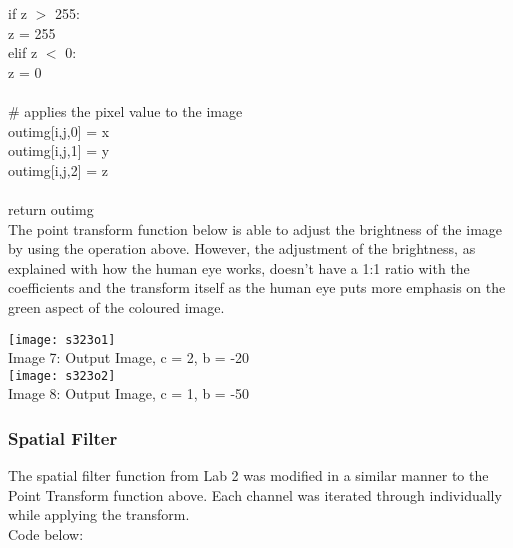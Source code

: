 \documentclass{article}
\begin{document}
	\indent \indent \indent if z $>$ 255:\\
	\indent \indent \indent \indent z = 255\\
	\indent \indent \indent elif z $<$ 0:\\
	\indent \indent \indent \indent z = 0\\
	\\
	\indent \indent \indent \# applies the pixel value to the image\\
	\indent \indent \indent out\textunderscore img[i,j,0] = x\\
	\indent \indent \indent out\textunderscore img[i,j,1] = y\\
	\indent \indent \indent out\textunderscore img[i,j,2] = z\\
	\\
	\indent return out\textunderscore img\\
	
	The point transform function below is able to adjust the brightness of the image by using the operation above. However, the adjustment of the brightness, as explained with how the human eye works, doesn't have a 1:1 ratio with the coefficients and the transform itself as the human eye puts more emphasis on the green aspect of the coloured image.\\
	
	\begin{center}
		
		\noindent \texttt{[image: s323o1]}\\
		Image 7: Output Image, c = 2, b = -20\\
		
		\noindent \texttt{[image: s323o2]}\\
		Image 8: Output Image, c = 1, b = -50\\
	\end{center}
	
	\subsubsection{Spatial Filter}
	
	The spatial filter function from Lab 2 was modified in a similar manner to the Point Transform function above. Each channel was iterated through individually while applying the transform.\\
	
	Code below:\\
	
\end{document}
